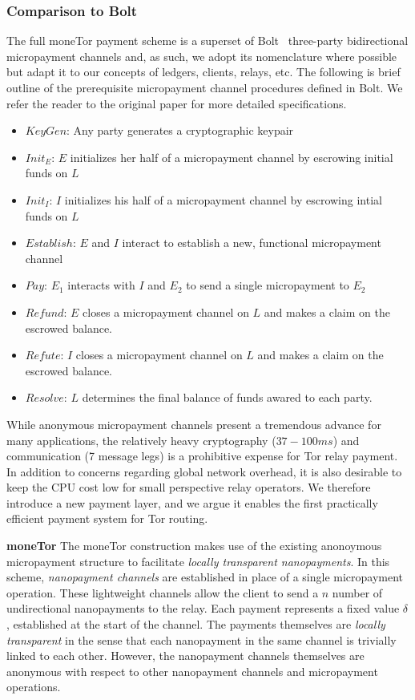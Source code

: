 \subsubsection{Comparison to Bolt}

The full moneTor payment scheme is a superset of Bolt~\cite{green2017bolt} three-party bidirectional
micropayment channels and, as such, we adopt its nomenclature where possible but
adapt it to our concepts of ledgers, clients, relays, etc. The following is brief
outline of the prerequisite micropayment channel procedures defined in Bolt. We
refer the reader to the original paper for more detailed
specifications.

\begin{itemize}
\item $KeyGen$: Any party generates a cryptographic keypair
\item $Init_E$: $E$ initializes her half of a micropayment channel by escrowing
  initial funds on $L$
\item $Init_I$: $I$ initializes his half of a micropayment channel by
  escrowing intial funds on $L$
\item $Establish$: $E$ and $I$ interact to establish a new, functional
  micropayment channel
\item $Pay$: $E_1$ interacts with $I$ and $E_2$ to send a single micropayment to $E_2$
\item $Refund$: $E$ closes a micropayment channel on $L$ and makes a claim on
  the escrowed balance.
\item $Refute$: $I$ closes a micropayment channel on $L$ and makes a claim on
  the escrowed balance.
\item $Resolve$: $L$ determines the final balance of funds awared to
  each party.
\end{itemize}

While anonymous micropayment channels present a tremendous advance for many
applications, the relatively heavy cryptography ($37-100 ms$) and communication
(7 message legs) is a prohibitive expense for Tor relay payment. In addition to
concerns regarding global network overhead, it is also desirable to keep the
CPU cost low for small perspective relay operators. We therefore
introduce a new payment layer, and we argue it enables the first practically efficient
payment system for Tor routing.

\textbf{moneTor} The moneTor construction makes use of the existing anonoymous
micropayment structure to facilitate \emph{locally transparent nanopayments}. In
this scheme, \emph{nanopayment channels} are established in place of a single
micropayment operation. These lightweight channels allow the client to send a
$n$ number of undirectional nanopayments to the relay. Each payment represents a
fixed value $\delta$, established at the start of the channel. The payments
themselves are \emph{locally transparent} in the sense that each nanopayment in
the same channel is trivially linked to each other. However, the nanopayment
channels themselves are anonymous with respect to other nanopayment channels and
micropayment operations.

